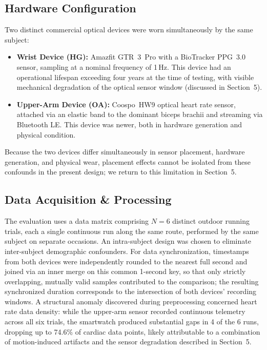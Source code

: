 \documentclass{acmsiggraph}
\begin{document}
	\subsection{Hardware Configuration}
	
	Two distinct commercial optical devices were worn simultaneously by the
	same subject:
	\begin{itemize}
		\item \textbf{Wrist Device (HG):} Amazfit GTR~3~Pro with a BioTracker
		PPG~3.0 sensor, sampling at a nominal frequency of 1\,Hz. This device
		had an operational lifespan exceeding four years at the time of
		testing, with visible mechanical degradation of the optical sensor
		window (discussed in Section~5).
		\item \textbf{Upper-Arm Device (OA):} Coospo~HW9 optical heart rate
		sensor, attached via an elastic band to the dominant biceps brachii and
		streaming via Bluetooth LE. This device was newer, both in hardware
		generation and physical condition.
	\end{itemize}
	Because the two devices differ simultaneously in sensor placement,
	hardware generation, and physical wear, placement effects cannot be
	isolated from these confounds in the present design; we return to this
	limitation in Section~5.
	
	\subsection{Data Acquisition \& Processing}
	
	The evaluation uses a data matrix comprising $N=6$ distinct outdoor
	running trials, each a single continuous run along the same route,
	performed by the same subject on separate occasions. An intra-subject
	design was chosen to eliminate inter-subject demographic confounders.
	For data synchronization, timestamps from both devices were independently
	rounded to the nearest full second and joined via an inner merge on this
	common 1-second key, so that only strictly overlapping, mutually valid
	samples contributed to the comparison; the resulting synchronized
	duration corresponds to the intersection of both devices' recording
	windows. A structural anomaly discovered during preprocessing concerned
	heart rate data density: while the upper-arm sensor recorded continuous
	telemetry across all six trials, the smartwatch produced substantial
	gaps in 4 of the 6 runs, dropping up to 74.6\% of cardiac data points,
	likely attributable to a combination of motion-induced artifacts and the
	sensor degradation described in Section~5.
	
\end{document}
